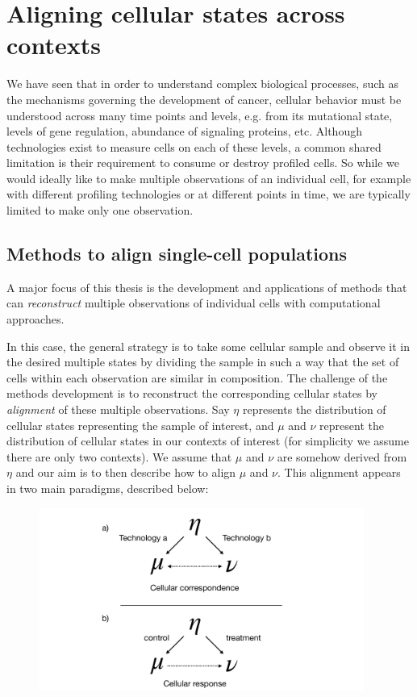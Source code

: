 \section{Aligning cellular states across contexts}
We have seen that in order to understand complex biological processes, such as the mechanisms governing the development of cancer, cellular behavior must be understood across many time points and levels, e.g. from its mutational state, levels of gene regulation, abundance of signaling proteins, etc.
Although technologies exist to measure cells on each of these levels,
a common shared limitation is their requirement to consume or destroy profiled cells.
So while we would ideally like to make multiple observations of an individual cell, for example with different profiling technologies or at different points in time, we are typically limited to make only one observation.

\subsection{Methods to align single-cell populations}
A major focus of this thesis is the development and applications of methods that can \emph{reconstruct} multiple observations of individual cells with computational approaches.

In this case, the general strategy is to take some cellular sample
and observe it in the desired multiple states
by dividing the sample in such a way that the set of cells within each observation are similar in composition.
The challenge of the methods development is to reconstruct the corresponding cellular states by \emph{alignment} of these multiple observations.
Say $\eta$ represents the distribution of cellular states representing the sample of interest, and $\mu$ and $\nu$ represent the distribution of cellular states in our contexts of interest (for simplicity we assume there are only two contexts).
We assume that $\mu$ and $\nu$ are somehow derived from $\eta$ and our aim is to then describe how to align $\mu$ and $\nu$.
This alignment appears in two main paradigms, described below:

\begin{figure}
  \begin{center}
    \includegraphics[width=0.95\textwidth]{figures/introduction/thesis-overview-pgm.pdf}
  \end{center}
  \caption{}\label{fig:thesis-overview-pgm}
\end{figure}


